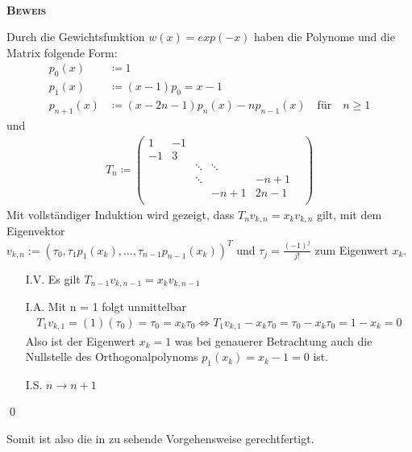 \documentclass[12pt,a4paper]{scrartcl}
\numberwithin{equation}{section}
\numberwithin{myalgctr}{section}
\numberwithin{mytheoremctr}{subsection}
\numberwithin{mykorollarctr}{subsection}
\numberwithin{mylemmactr}{subsection}
\numberwithin{mybeispielctr}{subsection}
\newenvironment{myproof}{%
	\bigskip\noindent%
	\textsc{\textbf{\\Beweis\\}}%
	\indent
}{\qed\par\bigskip}  %
\begin{document}
	\begin{myproof}
		Durch die Gewichtsfunktion $w(x) = exp(-x)$ haben die Polynome und die Matrix folgende Form:
		\begin{align*}
		p_0(x) &\coloneqq 1\\
		p_1(x) &\coloneqq (x-1) p_0 = x-1 \\
		p_{n+1}(x) &\coloneqq (x-2n-1)p_n(x)-n p_{n-1}(x) \quad \text{f\"ur}  \quad n\geq 1
		\end{align*} 
		und 
		\begin{align*}
		T_n\coloneqq 
		\begin{pmatrix}
		1 		     & 	-1			 	&  				  & &\\
		-1		 	 & 3				& 			   	  & & \\
		&   		 & \ddots 		    & \ddots 			&\\
		&					& \ddots 	&					& -n+1\\
		&		&			&-n+1 		&2n-1				&\\
		\end{pmatrix}
		\end{align*}
		Mit vollständiger Induktion wird gezeigt, dass $T_nv_{k,n} = x_kv_{k,n}$ gilt, mit dem Eigenvektor\\
		$v_{k,n} := (\tau_0,\tau_1p_1(x_k),\ldots,\tau_{n-1}p_{n-1}(x_k))^{T}$ und $\tau_j = \frac{(-1)^{j}}{j!}$ zum Eigenwert $x_k$.
		\begin{itemize}
			\item[I.V.] 
			Es gilt $T_{n-1}v_{k,n-1} = x_kv_{k,n-1}$
			\item[I.A.] 
			Mit n = 1 folgt unmittelbar
			\begin{align*}
			T_1v_{k,1} = (1)(\tau_0) = \tau_0 = x_k\tau_0 \Leftrightarrow T_1v_{k,1} - x_k\tau_0 = \tau_0 - x_k\tau_0 = 1 - x_k = 0
			\end{align*}
			Also ist der Eigenwert $x_k = 1$ was bei genauerer Betrachtung auch die Nullstelle des Orthogonalpolynoms $p_1(x_k) = x_k - 1 = 0$ ist. 
			\item[I.S.] $n \rightarrow n + 1$
			
		\end{itemize}
	\end{myproof}
	\newpage
	Somit ist also die in  zu sehende Vorgehensweise gerechtfertigt.
	
	
	
\end{document}
